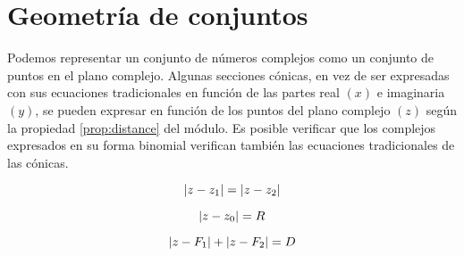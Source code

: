 \section{Geometría de conjuntos}

Podemos representar un conjunto de números complejos como un conjunto de puntos en el plano complejo.
Algunas secciones cónicas, en vez de ser expresadas con sus ecuaciones tradicionales en función de las partes real $(x)$ e imaginaria $(y)$, se pueden expresar en función de los puntos del plano complejo $(z)$ según la propiedad \ref{prop:distance} del módulo.
Es posible verificar que los complejos expresados en su forma binomial verifican también las ecuaciones tradicionales de las cónicas.

\begin{mdframed}[style=DefinitionFrame]
    \begin{defn}
    \end{defn}
    \begin{equation*}
        {\left| {z-z_1} \right|} = {\left| {z-z_2} \right|}
    \end{equation*}
\end{mdframed}

\begin{center}
    \def\svgwidth{0.6\linewidth}
    
\end{center}

\begin{mdframed}[style=DefinitionFrame]
    \begin{defn}
    \end{defn}
    \begin{equation*}
        {\left| {z-z_0} \right|} = R
    \end{equation*}
\end{mdframed}

\begin{center}
    \def\svgwidth{0.6\linewidth}
    
\end{center}

\begin{mdframed}[style=DefinitionFrame]
    \begin{defn}
    \end{defn}
    \begin{equation*}
        {\left| {z-F_1} \right|} + {\left| {z-F_2} \right|} = D
    \end{equation*}
\end{mdframed}

\begin{center}
    \def\svgwidth{0.6\linewidth}
    
\end{center}